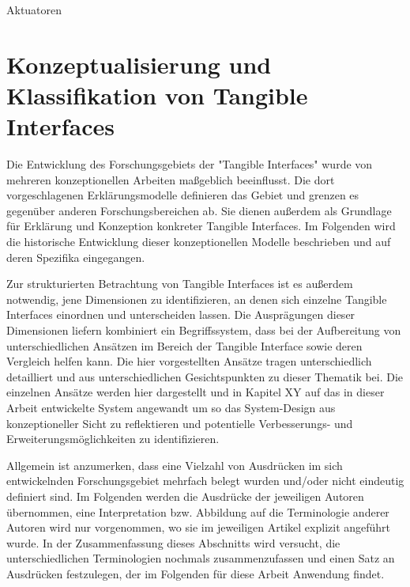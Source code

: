 Aktuatoren \citep{Patten07}



\section{Konzeptualisierung und Klassifikation von Tangible Interfaces} %
\label{sec:konzeptualisierungen_von_tangible_interfaces}

Die Entwicklung des Forschungsgebiets der "Tangible Interfaces" wurde von mehreren konzeptionellen Arbeiten maßgeblich beeinflusst. Die dort vorgeschlagenen Erklärungsmodelle definieren das Gebiet und grenzen es gegenüber anderen Forschungsbereichen ab. Sie dienen außerdem als Grundlage für Erklärung und Konzeption konkreter Tangible Interfaces. Im Folgenden wird die historische Entwicklung dieser konzeptionellen Modelle beschrieben und auf deren Spezifika eingegangen.

Zur strukturierten Betrachtung von Tangible Interfaces ist es außerdem notwendig, jene Dimensionen zu identifizieren, an denen sich einzelne Tangible Interfaces einordnen und unterscheiden lassen. Die Ausprägungen dieser Dimensionen liefern kombiniert ein Begriffssystem, dass bei der Aufbereitung von unterschiedlichen Ansätzen im Bereich der Tangible Interface sowie deren Vergleich helfen kann. Die hier vorgestellten Ansätze tragen unterschiedlich detailliert und aus unterschiedlichen Gesichtspunkten zu dieser Thematik bei. Die einzelnen Ansätze werden hier dargestellt und in Kapitel XY auf das in dieser Arbeit entwickelte System angewandt um so das System-Design aus konzeptioneller Sicht zu reflektieren und potentielle Verbesserungs- und Erweiterungsmöglichkeiten zu identifizieren.

Allgemein ist anzumerken, dass eine Vielzahl von Ausdrücken im sich entwickelnden Forschungsgebiet mehrfach belegt wurden und/oder nicht eindeutig definiert sind. Im Folgenden werden die Ausdrücke der jeweiligen Autoren übernommen, eine Interpretation bzw. Abbildung auf die Terminologie anderer Autoren wird nur vorgenommen, wo sie im jeweiligen Artikel explizit angeführt wurde. In der Zusammenfassung dieses Abschnitts wird versucht, die unterschiedlichen Terminologien nochmals zusammenzufassen und einen Satz an Ausdrücken festzulegen, der im Folgenden für diese Arbeit Anwendung findet.

